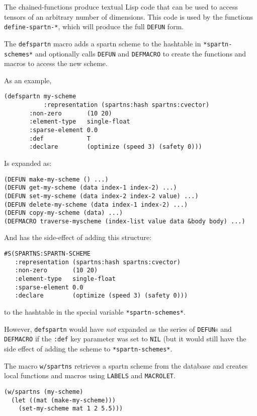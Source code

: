 \documentclass{article}
\begin{document}
The chained-functions produce textual Lisp code that can be used to access
tensors of an arbitrary number of dimensions. This code is used by the functions
\verb+define-spartn-*+, which will produce the full \verb+DEFUN+ form.

The \verb+defspartn+ macro adds a spartn scheme to the hashtable in
\verb+*spartn-schemes*+ and optionally calls \verb+DEFUN+ and \verb+DEFMACRO+ to create the functions
and macros to access the new scheme.

As an example,

\begin{lstlisting}
(defspartn my-scheme
           :representation (spartns:hash spartns:cvector)
	   :non-zero       (10 20)
	   :element-type   single-float
	   :sparse-element 0.0
	   :def            T
	   :declare        (optimize (speed 3) (safety 0)))
\end{lstlisting}

Is expanded as:

\begin{lstlisting}
(DEFUN make-my-scheme () ...)
(DEFUN get-my-scheme (data index-1 index-2) ...)
(DEFUN set-my-scheme (data index-2 index-2 value) ...)
(DEFUN delete-my-scheme (data index-1 index-2) ...)
(DEFUN copy-my-scheme (data) ...)
(DEFMACRO traverse-myscheme (index-list value data &body body) ...)
\end{lstlisting}

And has the side-effect of adding this structure:

\begin{lstlisting}
#S(SPARTNS:SPARTN-SCHEME
   :representation (spartns:hash spartns:cvector)
   :non-zero       (10 20)
   :element-type   single-float
   :sparse-element 0.0
   :declare        (optimize (speed 3) (safety 0)))
\end{lstlisting}

to the hashtable in the special variable \verb+*spartn-schemes*+.

However, \verb+defspartn+ would have {\em not} expanded as the series of \verb+DEFUN+s and
\verb+DEFMACRO+ if the \verb+:def+ key parameter was set to \verb+NIL+ (but it would still have the side
effect of adding the scheme to \verb+*spartn-schemes*+.

The macro \verb+w/spartns+ retrieves a spartn scheme from the database and creates local
functions and macros using \verb+LABELS+ and \verb+MACROLET+.

\begin{lstlisting}
(w/spartns (my-scheme)
  (let ((mat (make-my-scheme)))
    (set-my-scheme mat 1 2 5.5)))
\end{lstlisting}
\end{document}
